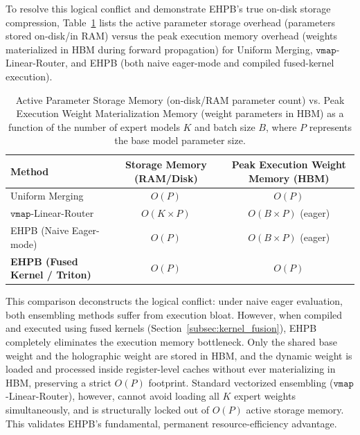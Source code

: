 \documentclass{article}
\theoremstyle{plain}
\theoremstyle{definition}
\theoremstyle{remark}
\begin{document}
To resolve this logical conflict and demonstrate EHPB's true on-disk storage compression, Table~\ref{tab:memory_scaling_app} lists the active parameter storage overhead (parameters stored on-disk/in RAM) versus the peak execution memory overhead (weights materialized in HBM during forward propagation) for Uniform Merging, $\mathtt{vmap}$-Linear-Router, and EHPB (both naive eager-mode and compiled fused-kernel execution).

\begin{table}[h]
\caption{Active Parameter Storage Memory (on-disk/RAM parameter count) vs. Peak Execution Weight Materialization Memory (weight parameters in HBM) as a function of the number of expert models $K$ and batch size $B$, where $P$ represents the base model parameter size.}
\label{tab:memory_scaling_app}
\vskip 0.15in
\begin{center}
\begin{small}
\begin{sc}
\begin{tabular}{lcc}
\toprule
Method & Storage Memory (RAM/Disk) & Peak Execution Weight Memory (HBM) \\
\midrule
Uniform Merging & $O(P)$ & $O(P)$ \\
$\mathtt{vmap}$-Linear-Router & $O(K \times P)$ & $O(B \times P)$ (eager) \\
EHPB (Naive Eager-mode) & $O(P)$ & $O(B \times P)$ (eager) \\
\textbf{EHPB (Fused Kernel / Triton)} & \textbf{$O(P)$} & \textbf{$O(P)$} \\
\bottomrule
\end{tabular}
\end{sc}
\end{small}
\end{center}
\vskip -0.1in
\end{table}

This comparison deconstructs the logical conflict: under naive eager evaluation, both ensembling methods suffer from execution bloat. However, when compiled and executed using fused kernels (Section~\ref{subsec:kernel_fusion}), EHPB completely eliminates the execution memory bottleneck. Only the shared base weight and the holographic weight are stored in HBM, and the dynamic weight is loaded and processed inside register-level caches without ever materializing in HBM, preserving a strict $O(P)$ footprint. Standard vectorized ensembling ($\mathtt{vmap}$-Linear-Router), however, cannot avoid loading all $K$ expert weights simultaneously, and is structurally locked out of $O(P)$ active storage memory. This validates EHPB's fundamental, permanent resource-efficiency advantage.
\end{document}
